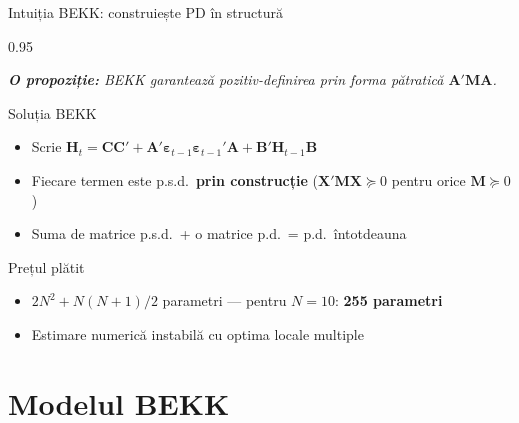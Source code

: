 \documentclass[9pt, aspectratio=169, t]{beamer}
\begin{document}
\begin{frame}{Intuiția BEKK: construiește PD în structură}
    \begin{cminipage}{0.95\textwidth}
    {\footnotesize
    \textit{\textbf{O propoziție:} BEKK garantează pozitiv-definirea prin forma pătratică $\mathbf{A}'\mathbf{M}\mathbf{A}$.}
    \vspace{0.2cm}
    \begin{block}{Soluția BEKK}
        \begin{itemize}\setlength{\itemsep}{2pt}
            \item Scrie $\mathbf{H}_t = \mathbf{C}\mathbf{C}' + \mathbf{A}'\boldsymbol{\varepsilon}_{t-1}\boldsymbol{\varepsilon}_{t-1}'\mathbf{A} + \mathbf{B}'\mathbf{H}_{t-1}\mathbf{B}$
            \item Fiecare termen este p.s.d.\ \textbf{prin construcție} ($\mathbf{X}'\mathbf{M}\mathbf{X} \succeq 0$ pentru orice $\mathbf{M} \succeq 0$)
            \item Suma de matrice p.s.d.\ + o matrice p.d.\ = p.d.\ întotdeauna
        \end{itemize}
    \end{block}
    \vspace{0.1cm}
    \begin{alertblock}{Prețul plătit}
        \begin{itemize}\setlength{\itemsep}{0pt}
            \item $2N^2 + N(N+1)/2$ parametri --- pentru $N = 10$: \textbf{255 parametri}
            \item Estimare numerică instabilă cu optima locale multiple
        \end{itemize}
    \end{alertblock}
    }
    \end{cminipage}
\end{frame}

\section{Modelul BEKK}
\end{document}

